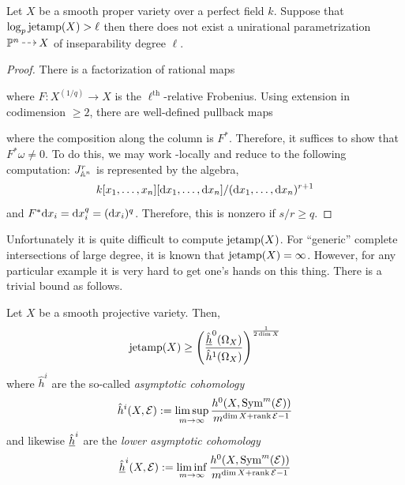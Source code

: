 \documentclass[main.tex]{subfiles}
\begin{document}
\begin{theorem}[C]
Let $X$ be a smooth proper variety over a perfect field $k$. Suppose that $\log_p \mathrm{jetamp}(X) > \ell$ then there does not exist a unirational parametrization $\P^n \rat X$ of inseparability degree $\ell$.
\end{theorem}

\begin{proof}
There is a factorization of rational maps
\begin{center}
\end{center}
where $F : X^{(1/q)} \to X$ is the $\ell^{\text{th}}$-relative Frobenius.
Using extension in codimension $\ge 2$, there are well-defined pullback maps
\begin{center}
\end{center}
where the composition along the column is $F^*$. Therefore, it suffices to show that $F^* \omega \neq 0$. To do this, we may work \etale-locally and reduce to the following computation: $J^r_{\mathbb{A}^n}$ is represented by the algebra,
\[ k[x_1, \dots, x_n][\mathrm{d}{x_1}, \dots, \mathrm{d}{x_n}] / (\mathrm{d}{x_1}, \dots, \mathrm{d}{x_n})^{r+1} \] and $F^* \mathrm{d}{x_i} = \mathrm{d}{x_i^{q}} = (\mathrm{d}{x_i})^{q}$. Therefore, this is nonzero if $s/r \ge q$.
\end{proof}

Unfortunately it is quite difficult to compute $\mathrm{jetamp}(X)$. For ``generic'' complete intersections of large degree, it is known that $\mathrm{jetamp}(X) = \infty$. However, for any particular example it is very hard to get one's hands on this thing. There is a trivial bound as follows.


\begin{prop}
Let $X$ be a smooth projective variety. Then,
\[ \mathrm{jetamp}(X) \ge \left(\frac{\underline{\hat{h}}^0(\Omega_X)}{\hat{h}^1(\Omega_X)}\right)^{\frac{1}{2 \dim{X}}} \]
where $\hat{h}^i$ are the so-called \textit{asymptotic cohomology}
\[ \hat{h}^i(X, \mathcal{E}) := \limsup_{m \to \infty} \frac{h^0(X, \mathrm{Sym}^{m}\! \left( \mathcal{E} \right))}{m^{\dim{X} + \operatorname{\mathrm{rank}}{\mathcal{E}} - 1}} \]
and likewise $\underline{\hat{h}}^i$ are the \textit{lower asymptotic cohomology}
\[ \underline{\hat{h}}^i(X, \mathcal{E}) := \liminf_{m \to \infty} \frac{h^0(X, \mathrm{Sym}^{m}\! \left( \mathcal{E} \right))}{m^{\dim{X} + \operatorname{\mathrm{rank}}{\mathcal{E}} - 1}} \]
\end{prop}
\end{document}
